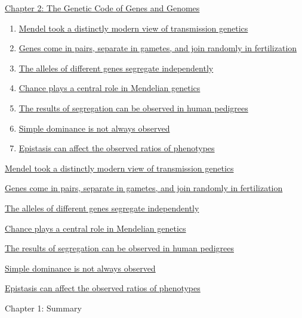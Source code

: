 \documentclass[12pt,letterpaper]{article}
\begin{document}
\begin{chapbox}{\hyperlink{home}{Chapter 2: The Genetic Code of Genes
    and Genomes}}
    \begin{enumerate}
        \item \hyperlink{2.1}{Mendel took a distinctly modern view of transmission genetics}
        \item \hyperlink{2.2}{Genes come in pairs, separate in gametes, and join randomly in fertilization}
        \item \hyperlink{2.3}{The alleles of different genes segregate independently}
        \item \hyperlink{2.4}{Chance plays a central role in Mendelian genetics}
        \item \hyperlink{2.5}{The results of segregation can be observed in human pedigrees}
        \item \hyperlink{2.6}{Simple dominance is not always observed}
        \item \hyperlink{2.7}{Epistasis can affect the observed ratios of phenotypes}
    \end{enumerate}
\end{chapbox}


\hypertarget{2.1}{}
\begin{secbox}{\hyperlink{2}{Mendel took a distinctly modern view of transmission genetics}}{

}\end{secbox}
\hypertarget{2.2}{}
\begin{secbox}{\hyperlink{2}{Genes come in pairs, separate in gametes, and join randomly in fertilization}}{

}\end{secbox}
\hypertarget{2.3}{}
\begin{secbox}{\hyperlink{2}{The alleles of different genes segregate independently}}{

}\end{secbox}
\hypertarget{2.4}{}
\begin{secbox}{\hyperlink{2}{Chance plays a central role in Mendelian genetics}}{

}\end{secbox}
\hypertarget{2.5}{}
\begin{secbox}{\hyperlink{2}{The results of segregation can be observed in human pedigrees}}{

}\end{secbox}
\hypertarget{2.6}{}
\begin{secbox}{\hyperlink{2}{Simple dominance is not always observed}}{

}\end{secbox}
\hypertarget{2.7}{}
\begin{secbox}{\hyperlink{2}{Epistasis can affect the observed ratios of phenotypes}}{

}\end{secbox}

\begin{probbox}{Chapter 1: Summary}\end{probbox}

\end{document}
